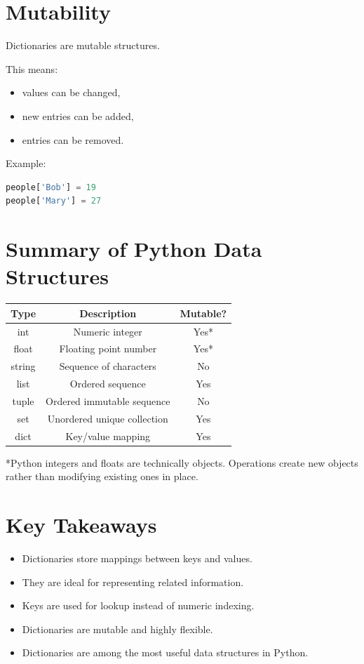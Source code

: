 \documentclass[11pt]{article}
\begin{document}
\section{Mutability}

Dictionaries are mutable structures.

This means:

\begin{itemize}
    \item values can be changed,
    \item new entries can be added,
    \item entries can be removed.
\end{itemize}

Example:

\begin{lstlisting}[language=Python]
people['Bob'] = 19
people['Mary'] = 27
\end{lstlisting}

\section{Summary of Python Data Structures}

\begin{center}
\begin{tabular}{|c|c|c|}
\hline
Type & Description & Mutable? \\
\hline
int & Numeric integer & Yes* \\
float & Floating point number & Yes* \\
string & Sequence of characters & No \\
list & Ordered sequence & Yes \\
tuple & Ordered immutable sequence & No \\
set & Unordered unique collection & Yes \\
dict & Key/value mapping & Yes \\
\hline
\end{tabular}
\end{center}

\vspace{0.5cm}

\noindent
*Python integers and floats are technically objects. Operations create new objects rather than modifying existing ones in place.

\section{Key Takeaways}

\begin{itemize}
    \item Dictionaries store mappings between keys and values.
    \item They are ideal for representing related information.
    \item Keys are used for lookup instead of numeric indexing.
    \item Dictionaries are mutable and highly flexible.
    \item Dictionaries are among the most useful data structures in Python.
\end{itemize}
\end{document}
